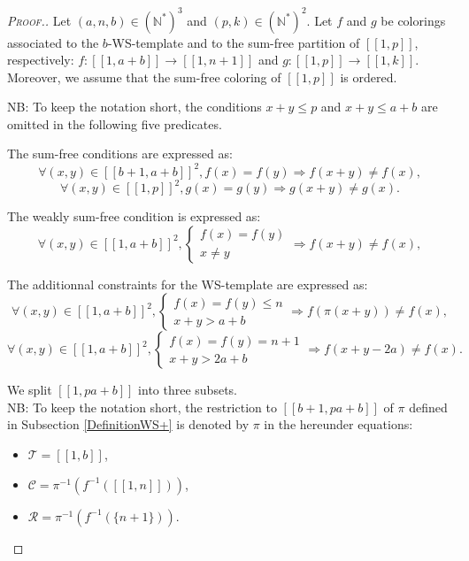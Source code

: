 \begin{proof}[\textsc{Proof.}]
\begin{sloppypar}
Let \((a,n,b) \in (\mathbb{N}^*)^3\) and \((p,k) \in (\mathbb{N}^*)^2\). Let \(f\) and \(g\) be colorings associated 
to the \(b\)-WS-template and to the sum-free partition of \([\![1,p]\!]\), respectively: 
\({f : [\![1, a + b]\!] \longrightarrow [\![1,n+1]\!]}\) and \({g : [\![1, p]\!]  \longrightarrow [\![1, k]\!]}\). Moreover, 
we assume that the sum-free coloring of \([\![1, p]\!]\) is ordered.
\end{sloppypar}

\par
NB: To keep the notation short, the conditions \(x + y \leqslant p\)  and \(x + y \leqslant a + b\) are omitted in the following five predicates.

The sum-free conditions are expressed as:
\[
\forall (x,y) \in [\![b+1,a + b]\!]^2, f(x) = f(y) \Longrightarrow f(x+y) \neq f(x),
\]
\[
\forall (x,y) \in [\![1,p]\!]^2, g(x) = g(y) \Longrightarrow g(x+y) \neq g(x).
\]

The weakly sum-free condition is expressed as:
\[
\forall (x,y) \in [\![1,a + b]\!]^2, \left\{
\begin{array}{l}
	f(x) = f(y) \\
	x \neq y
\end{array}
\right. \Longrightarrow f(x+y) \neq f(x),
\]

The additionnal constraints for the WS-template are expressed as:
\[
\forall (x,y) \in [\![1,a + b]\!]^2, \left\{
\begin{array}{l}
	f(x) = f(y) \leqslant n \\
	x + y > a + b
\end{array}
\right. \Longrightarrow f(\pi(x+y)) \neq f(x),
\]
\[
\forall (x,y) \in [\![1,a + b]\!]^2, \left\{
\begin{array}{l}
	f(x) = f(y) = n + 1 \\
	x + y > 2 a + b
\end{array}
\right. \Longrightarrow f(x+y - 2 a) \neq f(x).
\]

We split \([\![1, p a + b]\!]\) into three subsets. \\
NB: To keep the notation short, the restriction to \([\![b + 1, p a + b]\!]\) of \(\pi\) defined in Subsection \ref{DefinitionWS+}
is denoted by \(\pi\) in the hereunder equations:

\begin{itemize}
	\item \(\mathcal{T} = [\![1, b]\!]\),
	\item \(\mathcal{C} = \pi^{-1}(f^{-1}([\![1, n]\!]))\),
	\item \(\mathcal{R} = \pi^{-1}(f^{-1}(\{n + 1\}))\).
\end{itemize}


\end{proof}
